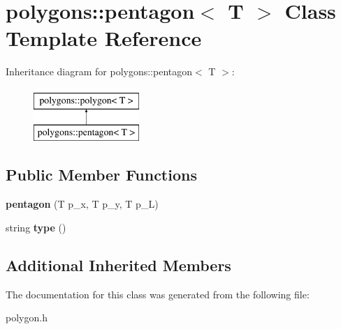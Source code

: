 \hypertarget{classpolygons_1_1pentagon}{\section{polygons\-:\-:pentagon$<$ T $>$ Class Template Reference}
\label{classpolygons_1_1pentagon}
}
Inheritance diagram for polygons\-:\-:pentagon$<$ T $>$\-:\begin{figure}[H]
\begin{center}
\leavevmode
\includegraphics[height=2.000000cm]{classpolygons_1_1pentagon}
\end{center}
\end{figure}
\subsection*{Public Member Functions}
\begin{DoxyCompactItemize}
\item 
\hypertarget{classpolygons_1_1pentagon_a2b36bfb6a6cca42632ca15382c246766}{{\bfseries pentagon} (T p\-\_\-x, T p\-\_\-y, T p\-\_\-\-L)}\label{classpolygons_1_1pentagon_a2b36bfb6a6cca42632ca15382c246766}

\item 
\hypertarget{classpolygons_1_1pentagon_a9c3f3cec5d2116ca493ba2bbf53d778d}{string {\bfseries type} ()}\label{classpolygons_1_1pentagon_a9c3f3cec5d2116ca493ba2bbf53d778d}

\end{DoxyCompactItemize}
\subsection*{Additional Inherited Members}


The documentation for this class was generated from the following file\-:\begin{DoxyCompactItemize}
\item 
polygon.\-h\end{DoxyCompactItemize}
